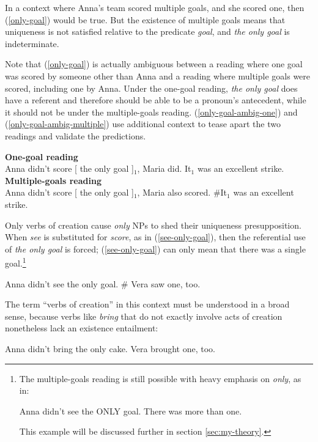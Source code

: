 In a context where Anna's team scored multiple goals, and she scored one, then (\ref{only-goal}) would be true. But the existence of multiple goals means that uniqueness is not satisfied relative to the predicate \textit{goal}, and \textit{the only goal} is indeterminate.

Note that (\ref{only-goal}) is actually ambiguous between a reading where one goal was scored by someone other than Anna and a reading where multiple goals were scored, including one by Anna. Under the one-goal reading, \textit{the only goal} does have a referent and therefore should be able to be a pronoun's antecedent, while it should not be under the multiple-goals reading. (\ref{only-goal-ambig-one}) and (\ref{only-goal-ambig-multiple}) use additional context to tease apart the two readings and validate the predictions.

\begin{exe}
	\ex \label{only-goal-ambig-one} \textbf{One-goal reading} \\ Anna didn't score [ the only goal ]$_1$, Maria did. It$_1$ was an excellent strike.
	\ex \label{only-goal-ambig-multiple} \textbf{Multiple-goals reading} \\ Anna didn't score [ the only goal ]$_1$, Maria also scored. \#It$_1$ was an excellent strike.
\end{exe}

Only verbs of creation cause \textit{only} NPs to shed their uniqueness presupposition. When \textit{see} is substituted for \textit{score}, as in (\ref{see-only-goal}), then the referential use of \textit{the only goal} is forced; (\ref{see-only-goal}) can only mean that there was a single goal.\footnote{The multiple-goals reading is still possible with heavy emphasis on \textit{only}, as in: \begin{exe} \ex Anna didn't see the ONLY goal. There was more than one. \end{exe} This example will be discussed further in section \ref{sec:my-theory}.}

\begin{exe}
	\ex \label{see-only-goal} Anna didn't see the only goal. \# Vera saw one, too.
\end{exe}

The term ``verbs of creation'' in this context must be understood in a broad sense, because verbs like \textit{bring} that do not exactly involve acts of creation nonetheless lack an existence entailment:

\begin{exe}
	\ex Anna didn't bring the only cake. Vera brought one, too.
\end{exe}

